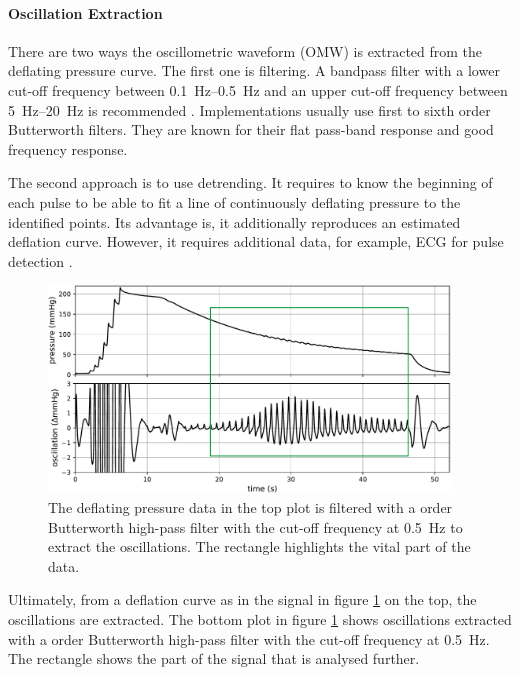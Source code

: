 \paragraph{Oscillation Extraction} There are two ways the oscillometric waveform (OMW) is extracted from the deflating pressure curve. The first one is filtering. A bandpass filter with a lower cut-off frequency between \SIrange{0.1}{0.5}{\Hz} and an upper cut-off frequency between \SIrange{5}{20}{\Hz} is recommended \citep{Forouzanfar2015}. Implementations usually use first \citep{Lim2015} to sixth order \citep{Jazbinsek2010} Butterworth filters. They are known for their flat pass-band response and good frequency response. 

The second approach is to use detrending. It requires to know the beginning of each pulse to be able to fit a line of continuously deflating pressure to the identified points. Its advantage is, it additionally reproduces an estimated deflation curve. However, it requires additional data, for example, ECG for pulse detection \citep{Forouzanfar2015}.

\begin{figure}[h]
\centering
\includegraphics[width=0.95\textwidth]{figures/sample_data.pdf}
\caption{The deflating pressure data in the top plot is filtered with a  order Butterworth high-pass filter with the cut-off frequency at \SI{0.5}{\Hz} to extract the oscillations. The rectangle highlights the vital part of the data.}
\label{fig:osc}
\end{figure}


Ultimately, from a deflation curve as in the signal in figure \ref{fig:osc} on the top, the oscillations are extracted. The bottom plot in figure \ref{fig:osc} shows oscillations extracted with a  order Butterworth high-pass filter with the cut-off frequency at \SI{0.5}{\Hz}. The rectangle shows the part of the signal that is analysed further.


